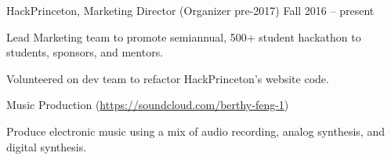 \documentclass[12pt]{my_resume}
\begin{document}
\vspace{-8pt}

\begin{resitem}{HackPrinceton, Marketing Director (Organizer pre-2017)}%
{Fall 2016 -- present}
  \item Lead Marketing team to promote semiannual, 500+ student hackathon %
  to students, sponsors, and mentors.
  \item Volunteered on dev team to refactor HackPrinceton’s website code. %
\end{resitem}

\vspace{-8pt}

\begin{resitem}{Music Production %
(\url{https://soundcloud.com/berthy-feng-1})}{}
  \item Produce electronic music using a mix of audio recording, %
  analog synthesis, and digital synthesis.
\end{resitem}
\end{document}

